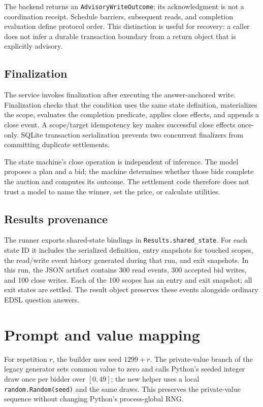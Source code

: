 \documentclass[11pt]{article}
\begin{document}
The backend returns an \texttt{AdvisoryWriteOutcome}; its acknowledgment is not a coordination receipt. Schedule barriers, subsequent reads, and completion evaluation define protocol order. This distinction is useful for recovery: a caller does not infer a durable transaction boundary from a return object that is explicitly advisory.

\subsection{Finalization}

The service invokes finalization after executing the answer-anchored write. Finalization checks that the condition uses the same state definition, materializes the scope, evaluates the completion predicate, applies close effects, and appends a close event. A scope/target idempotency key makes successful close effects once-only. SQLite transaction serialization prevents two concurrent finalizers from committing duplicate settlements.

The state machine's close operation is independent of inference. The model proposes a plan and a bid; the machine determines whether those bids complete the auction and computes its outcome. The settlement code therefore does not trust a model to name the winner, set the price, or calculate utilities.

\subsection{Results provenance}

The runner exports shared-state bindings in \texttt{Results.shared\_state}. For each state ID it includes the serialized definition, entry snapshots for touched scopes, the read/write event history generated during that run, and exit snapshots. In this run, the JSON artifact contains 300 read events, 300 accepted bid writes, and 100 close writes. Each of the 100 scopes has an entry and exit snapshot; all exit states are settled. The result object preserves these events alongside ordinary EDSL question answers.

\section{Prompt and value mapping}

For repetition \(r\), the builder uses seed \(1299+r\). The private-value branch of the legacy generator sets common value to zero and calls Python's seeded integer draw once per bidder over \([0,49]\); the new helper uses a local \texttt{random.Random(seed)} and the same draws. This preserves the private-value sequence without changing Python's process-global RNG.
\end{document}
